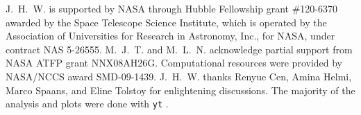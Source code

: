 \documentclass[12pt,preprint]{aastex}
\begin{document}
\acknowledgments

J.~H.~W. is supported by NASA through Hubble Fellowship grant
\#120-6370 awarded by the Space Telescope Science Institute, which is
operated by the Association of Universities for Research in Astronomy,
Inc., for NASA, under contract NAS 5-26555.  M.~J.~T. and
M.~L.~N. acknowledge partial support from NASA ATFP grant NNX08AH26G.
Computational resources were provided by NASA/NCCS award SMD-09-1439.
J.~H.~W. thanks Renyue Cen, Amina Helmi, Marco Spaans, and Eline
Tolstoy for enlightening discussions.  The majority of the analysis
and plots were done with \texttt{yt} \citep{yt_full_paper}.

%

\end{document}
